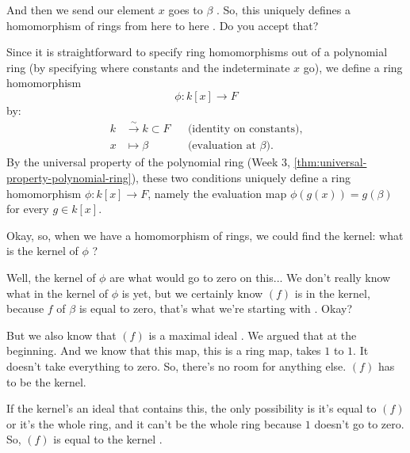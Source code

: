 \begin{proofWrapper}
\begin{speech}[01:26:22 - 01:27:53]
And then we send our element $x$ goes to $\beta$ . So, this uniquely defines a homomorphism of rings from here to here . Do you accept that?
\end{speech}

\begin{content}
Since it is straightforward to specify ring homomorphisms out of a polynomial ring (by specifying where constants and the indeterminate $x$ go), we define a ring homomorphism
\[
\phi \colon k[x] \to F
\]
by:
\begin{align*}
k &\xrightarrow{\;\sim\;} k \subset F && \text{(identity on constants)}, \\
x &\longmapsto \beta && \text{(evaluation at $\beta$)}.
\end{align*}
By the universal property of the polynomial ring (Week 3, \cref{thm:universal-property-polynomial-ring}), these two conditions uniquely define a ring homomorphism $\phi \colon k[x] \to F$, namely the evaluation map $\phi(g(x)) = g(\beta)$ for every $g \in k[x]$.
\end{content}

\begin{speech}[01:27:53 - 01:29:23]
Okay, so, when we have a homomorphism of rings, we could find the kernel: what is the kernel of $\phi$ ?

Well, the kernel of $\phi$ are what would go to zero on this... We don't really know what in the kernel of $\phi$ is yet, but we certainly know $(f)$ is in the kernel, because $f$ of $\beta$ is equal to zero, that's what we're starting with . Okay?

But we also know that $(f)$ is a maximal ideal . We argued that at the beginning. And we know that this map, this is a ring map, takes $1$ to $1$. It doesn't take everything to zero. So, there's no room for anything else. $(f)$ has to be the kernel.

If the kernel's an ideal that contains this, the only possibility is it's equal to $(f)$ or it's the whole ring, and it can't be the whole ring because $1$ doesn't go to zero. So, $(f)$ is equal to the kernel .
\end{speech}


\end{proofWrapper}
